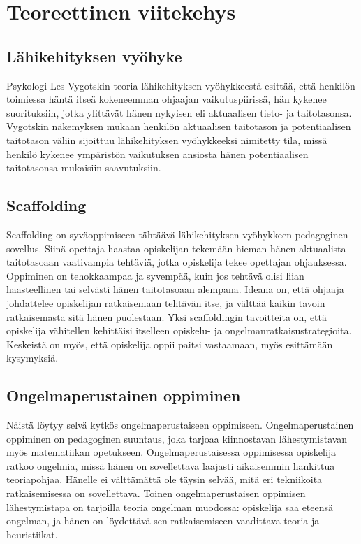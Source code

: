 \documentclass[a4paper,12pt,leqno,titlepage]{article}
\begin{document}
\pagebreak
\section{Teoreettinen viitekehys}
\subsection{Lähikehityksen vyöhyke}
Psykologi Les Vygotskin teoria lähikehityksen vyöhykkeestä esittää, että henkilön toimiessa häntä itseä kokeneemman ohjaajan vaikutuspiirissä, hän kykenee suorituksiin, jotka ylittävät hänen nykyisen eli aktuaalisen tieto- ja taitotasonsa. Vygotskin näkemyksen mukaan henkilön aktuaalisen taitotason ja potentiaalisen taitotason väliin sijoittuu lähikehityksen vyöhykkeeksi nimitetty tila, missä henkilö kykenee ympäristön vaikutuksen ansiosta hänen potentiaalisen taitotasonsa mukaisiin saavutuksiin.\cite{vygotsky1978mind}
\subsection{Scaffolding}
Scaffolding on syväoppimiseen tähtäävä lähikehityksen vyöhykkeen pedagoginen sovellus. Siinä opettaja haastaa opiskelijan tekemään hieman hänen aktuaalista taitotasoaan vaativampia tehtäviä, jotka opiskelija tekee opettajan ohjauksessa. Oppiminen on tehokkaampaa ja syvempää, kuin jos tehtävä olisi liian haasteellinen tai selvästi hänen taitotasoaan alempana. Ideana on, että ohjaaja johdattelee opiskelijan ratkaisemaan tehtävän itse, ja välttää kaikin tavoin ratkaisemasta sitä hänen puolestaan. Yksi scaffoldingin tavoitteita on, että opiskelija vähitellen kehittäisi itselleen opiskelu- ja ongelmanratkaisustrategioita. Keskeistä on myös, että opiskelija oppii paitsi vastaamaan, myös esittämään kysymyksiä.\cite{kirschnerswellerclark}
\subsection{Ongelmaperustainen oppiminen}
Näistä löytyy selvä kytkös ongelmaperustaiseen oppimiseen. Ongelmaperustainen oppiminen on pedagoginen suuntaus, joka tarjoaa kiinnostavan lähesty\-mistavan myös matematiikan opetukseen. Ongelmaperustaisessa oppimisessa opiskelija ratkoo ongelmia, missä hänen on sovellettava laajasti aikaisemmin hankittua teoriapohjaa. Hänelle ei välttämättä ole täysin selvää, mitä eri tekniikoita ratkaisemisessa on sovellettava. Toinen ongelmaperustaisen oppimisen lähestymistapa on tarjoilla teoria ongelman muodossa: opis\-kelija saa eteensä ongelman, ja hänen on löydettävä sen ratkaisemiseen vaadittava teoria ja heuristiikat.\cite{schoenfeld}
\end{document}
